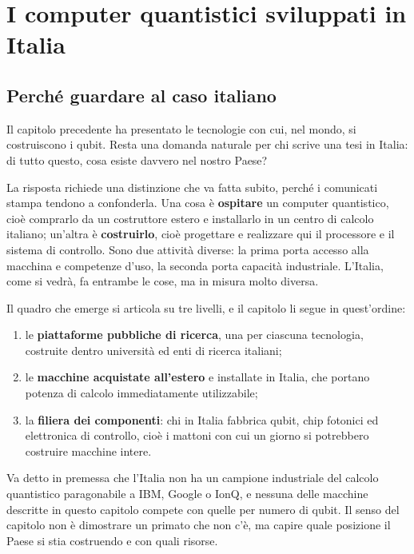 \chapter{I computer quantistici sviluppati in Italia}
\label{chap:italia}

\section{Perché guardare al caso italiano}
\label{sec:it-intro}

Il capitolo precedente ha presentato le tecnologie con cui, nel mondo, si
costruiscono i qubit. Resta una domanda naturale per chi scrive una tesi in
Italia: di tutto questo, cosa esiste davvero nel nostro Paese?

La risposta richiede una distinzione che va fatta subito, perché i comunicati
stampa tendono a confonderla. Una cosa è \textbf{ospitare} un computer
quantistico, cioè comprarlo da un costruttore estero e installarlo in un
centro di calcolo italiano; un'altra è \textbf{costruirlo}, cioè progettare e
realizzare qui il processore e il sistema di controllo. Sono due attività
diverse: la prima porta accesso alla macchina e competenze d'uso, la seconda
porta capacità industriale. L'Italia, come si vedrà, fa entrambe le cose, ma
in misura molto diversa.

Il quadro che emerge si articola su tre livelli, e il capitolo li segue in
quest'ordine:

\begin{enumerate}
  \item le \textbf{piattaforme pubbliche di ricerca}, una per ciascuna
    tecnologia, costruite dentro università ed enti di ricerca italiani;
  \item le \textbf{macchine acquistate all'estero} e installate in Italia, che
    portano potenza di calcolo immediatamente utilizzabile;
  \item la \textbf{filiera dei componenti}: chi in Italia fabbrica qubit, chip
    fotonici ed elettronica di controllo, cioè i mattoni con cui un giorno si
    potrebbero costruire macchine intere.
\end{enumerate}

Va detto in premessa che l'Italia non ha un campione industriale del calcolo
quantistico paragonabile a IBM, Google o IonQ, e nessuna delle macchine
descritte in questo capitolo compete con quelle per numero di qubit. Il senso
del capitolo non è dimostrare un primato che non c'è, ma capire quale
posizione il Paese si stia costruendo e con quali risorse.

